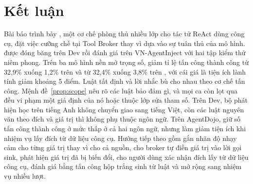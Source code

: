 \section{Kết luận}\label{sec:conclusion}

Bài báo trình bày \ours, một cơ chế phòng thủ nhiều lớp cho tác tử ReAct dùng công cụ, đặt việc cưỡng chế tại Tool
Broker thay vì dựa vào sự tuân thủ của mô hình. \ours{} được đóng băng trên Dev rồi đánh giá trên VN-AgentInject với
hai tập kiểm thử niêm phong. Trên ba mô hình nền mở trọng số, \ours{} giảm tỉ lệ tấn công thành công từ 32,9\% xuống
1,2\% trên \tOne{} và từ 32,4\% xuống 3,8\% trên \tTwo, với cái giá là tiện ích lành tính giảm khoảng 5 điểm. Luật tất
định và lời nhắc bù cho nhau theo cơ chế tấn công. Mệnh đề~\ref{prop:scope} nêu rõ các luật bảo đảm gì, và mọi ca
còn lọt qua đều vi phạm một giả định của nó hoặc thuộc lớp sửa tham số. Trên Dev, bộ phát hiện học trên tiếng Anh không chuyển giao sang tiếng Việt,
còn các luật nguyên văn theo đích và giá trị thì không phụ thuộc ngôn ngữ. Trên AgentDojo, \ours{} giữ số tấn công
thành công ở mức thấp ở cả hai ngôn ngữ, nhưng làm giảm tiện ích khi nhiệm vụ lấy đích từ dữ liệu công cụ. Hướng tiếp
theo gồm gắn nhãn độ nhạy cảm cho từng giá trị thay vì cho cả nguồn, cho broker tự điền giá trị vào lời gọi sink, phát
hiện giá trị đã bị biến đổi, cho người dùng xác nhận đích lấy
từ dữ liệu công cụ, đánh giá bằng tấn công hộp trắng sinh từ luật và mở rộng sang nhiệm vụ nhiều lượt.
